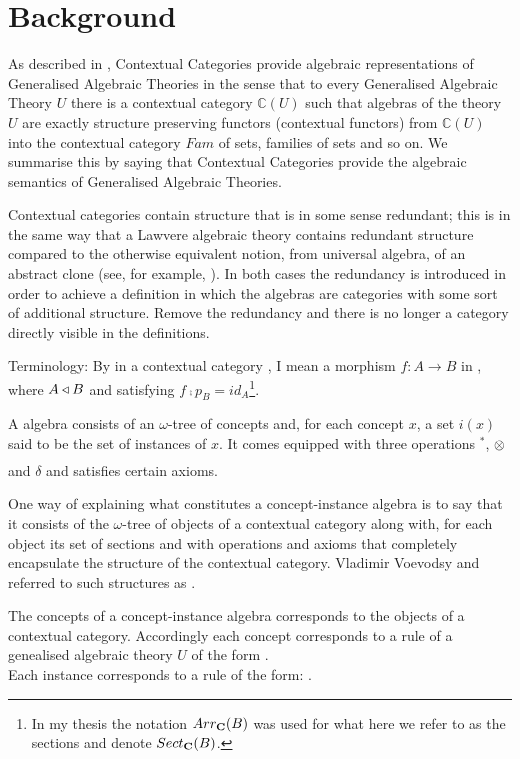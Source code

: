 \documentclass[10pt,a4paper]{article}
\begin{document}
\section{Background}
As described in \cite{Cartmell86}, Contextual Categories provide algebraic representations of Generalised Algebraic Theories  in the sense that to every Generalised Algebraic Theory $U$ there is a contextual category $\mathbb{C}(U)$ such that algebras of the theory $U$ are exactly structure preserving functors (contextual functors)  from $\mathbb{C}(U)$ into the contextual category $Fam$ of sets, families of sets and so on. We summarise this by saying that Contextual Categories provide the algebraic semantics of Generalised Algebraic Theories. 

\noindent
Contextual categories contain structure that is in some sense redundant; this is in the same way that a Lawvere algebraic theory contains redundant structure compared to the otherwise equivalent notion, from universal algebra, of an abstract clone (see, for example, \cite{KerkoffonClones}). In both cases the redundancy is introduced in order to achieve a definition in which the algebras are categories with some sort of additional structure. Remove the redundancy and there is no longer a category directly visible in the definitions.

Terminology: By 
 in a contextual category \catc, I mean a morphism $f:A\rightarrow B$ in \catc, where 
$A \triangleleft B$ and satisfying  $f \comp p_B = id_A$\footnote{In my thesis the notation $Arr_{\textbf{C}}(B)$ was used for what here we refer to as the sections and denote $Sect_{\textbf{C}}(B)$.}.


A  algebra consists of an $\omega$-tree of concepts and, 
for each concept $x$, a set $i(x)$
said to be the set of instances of $x$.
It comes equipped with three operations $^*$, $\underset{}{\otimes}$ and $\delta$ and   
satisfies certain axioms.

\noindent
One way of explaining what constitutes a concept-instance algebra 
is to say that it consists of the $\omega$-tree of objects of a contextual category along with, 
for each object its set of sections  and with operations and axioms that completely encapsulate the structure of the contextual category. Vladimir Voevodsy and referred to such structures as .

The concepts of a concept-instance algebra corresponds to the objects of a contextual category. 
Accordingly  each concept corresponds to  a rule of a genealised algebraic theory $U$ of the form
. \\
Each instance corresponds to a rule of the form:
 .
\end{document}
